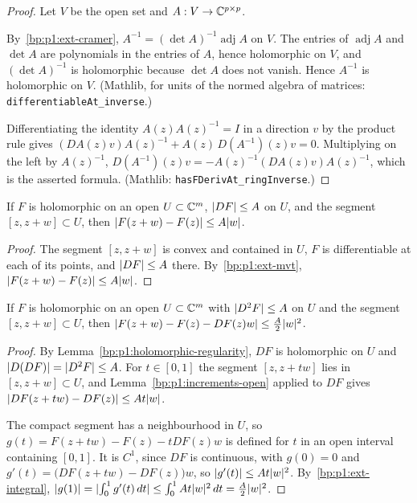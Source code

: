 \begin{proof}
Let $V$ be the open set and $A:V\to\mathbb{C}^{p\times p}$.

\label{step:p1:hi-holomorphic}
By~\ref{bp:p1:ext-cramer}, $A^{-1}=(\det A)^{-1}\operatorname{adj}A$ on $V$. The entries of
$\operatorname{adj}A$ and $\det A$ are polynomials in the entries of $A$, hence holomorphic on $V$, and
$(\det A)^{-1}$ is holomorphic because $\det A$ does not vanish. Hence $A^{-1}$ is holomorphic on $V$.
(Mathlib, for units of the normed algebra of matrices: \nolinkurl{differentiableAt_inverse}.)

\label{step:p1:hi-derivative}
Differentiating the identity $A(z)A(z)^{-1}=I$ in a direction $v$ by the product rule gives
$(DA(z)v)A(z)^{-1}+A(z)\,D(A^{-1})(z)v=0$. Multiplying on the left by $A(z)^{-1}$,
$D(A^{-1})(z)v=-A(z)^{-1}(DA(z)v)A(z)^{-1}$, which is the asserted formula.
(Mathlib: \nolinkurl{hasFDerivAt_ringInverse}.)
\end{proof}

\begin{lemma}\label{bp:p1:increments-open}
If $F$ is holomorphic on an open $U\subset\mathbb{C}^m$, $\lvert DF\rvert\le A$ on $U$, and the segment $[z,z+w]\subset U$, then
$\lvert F(z+w)-F(z)\rvert\le A\lvert w\rvert$.
\end{lemma}

\begin{proof}
\label{step:p1:io-mvt}
The segment $[z,z+w]$ is convex and contained in $U$, $F$ is differentiable at each of its points, and
$\lvert DF\rvert\le A$ there. By~\ref{bp:p1:ext-mvt}, $\lvert F(z+w)-F(z)\rvert\le A\lvert w\rvert$.
\end{proof}

\begin{lemma}\label{bp:p1:taylor}
If $F$ is holomorphic on an open $U\subset\mathbb{C}^m$ with $\lvert D^2F\rvert\le A$ on $U$ and the segment $[z,z+w]\subset U$, then
$\lvert F(z+w)-F(z)-DF(z)w\rvert\le\frac A2\lvert w\rvert^2$.
\end{lemma}

\begin{proof}
\label{step:p1:tay-lipschitz}
By Lemma~\ref{bp:p1:holomorphic-regularity}, $DF$ is holomorphic on $U$ and $\lvert D(DF)\rvert=\lvert D^2F\rvert\le A$.
For $t\in[0,1]$ the segment $[z,z+tw]$ lies in $[z,z+w]\subset U$, and Lemma~\ref{bp:p1:increments-open}
applied to $DF$ gives $\lvert DF(z+tw)-DF(z)\rvert\le At\lvert w\rvert$.

\label{step:p1:tay-integrate}
The compact segment has a neighbourhood in $U$, so $g(t)=F(z+tw)-F(z)-tDF(z)w$ is defined for $t$ in an
open interval containing $[0,1]$. It is $C^1$, since $DF$ is continuous, with $g(0)=0$ and
$g'(t)=\bigl(DF(z+tw)-DF(z)\bigr)w$, so $\lvert g'(t)\rvert\le At\lvert w\rvert^2$. By~\ref{bp:p1:ext-integral},
$\lvert g(1)\rvert=\lvert \int_0^1g'(t)\,dt\rvert\le\int_0^1At\lvert w\rvert^2\,dt=\frac A2\lvert w\rvert^2$.
\end{proof}

